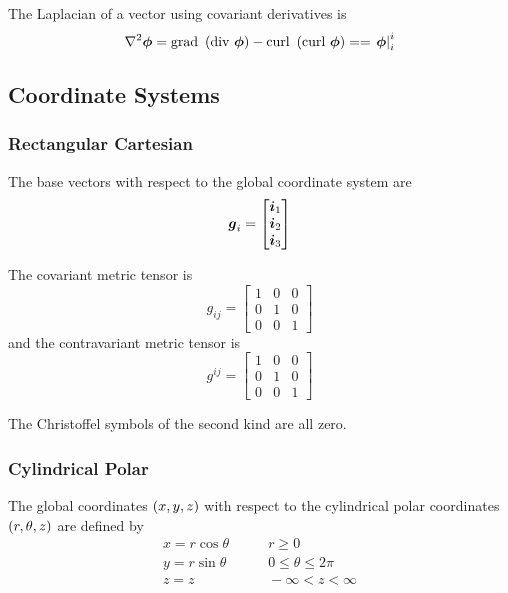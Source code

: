 The Laplacian of a vector using covariant derivatives is
\begin{equation}
  \laplacian{\vect{\phi}}=\text{grad }\pbrac{\text{div }\vect{\phi}}-\text{curl } \pbrac{\text{curl }\vect{\phi}}==\mixedderiv{\vect{\phi}}{i}{i}
\end{equation}

\subsection{Coordinate Systems}
\label{sec:coordinate systems}

\subsubsection{Rectangular Cartesian}

The base vectors with respect to the global coordinate system are
\begin{equation}
  \vect{g}_{i}=\begin{bmatrix} 
    \vect{i}_{1} \\ 
    \vect{i}_{2} \\
    \vect{i}_{3} 
  \end{bmatrix}
\end{equation}

The covariant metric tensor is
\begin{equation}
  g_{ij}=\begin{bmatrix}
    1 & 0 & 0 \\
    0 & 1 & 0 \\
    0 & 0 & 1
  \end{bmatrix}
\end{equation}
and the contravariant metric tensor is
\begin{equation}
  g^{ij}=\begin{bmatrix}
    1 & 0 & 0 \\
    0 & 1 & 0 \\
    0 & 0 & 1
  \end{bmatrix}
\end{equation}

The Christoffel symbols of the second kind are all zero.

\subsubsection{Cylindrical Polar}

The global coordinates  $\left( x,y,z \right)$ with respect to the cylindrical polar
coordinates $\left( r,\theta,z \right)$ are defined by
\begin{equation}
  \begin{aligned}
    x = r\cos\theta  & \qquad r \ge0 \\
    y = r\sin\theta & \qquad 0 \le\theta\le2\pi \\
    z = z          & \qquad -\infty < z < \infty
  \end{aligned}
\end{equation}

